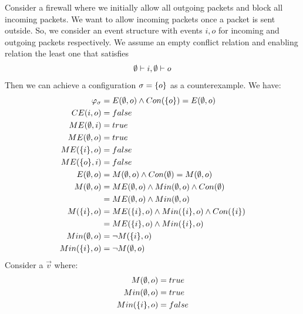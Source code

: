 \documentclass{article}
\begin{document}
\begin{example}
    Consider a firewall where we initially allow all outgoing packets and block all incoming packets.
    We want to allow incoming packets once a packet is sent outside.
    So, we consider an event structure with events $i,o$ for incoming and
    outgoing packets respectively.
    We assume an empty conflict relation and enabling relation
    the least one that satisfies
    \begin{align*}
        \emptyset \vdash i, \emptyset \vdash o
    \end{align*}
    Then we can achieve a configuration $\sigma = \{o\}$ as a
    counterexample.
    We have:
    \begin{align*}
        \varphi_{\sigma} & = E(\emptyset, o) \wedge Con(\{o\})
        = E(\emptyset, o)
        \\
        CE(i,o)          & = false                                             \\
        ME(\emptyset, i)        & = true                                              \\
        ME(\emptyset, o)        & = true                                              \\
        ME(\{i\}, o)     & = false                                             \\
        ME(\{o\}, i)     & = false                                             \\
        E(\emptyset, o)         & = M(\emptyset,o) \wedge Con(\emptyset)
        = M(\emptyset, o)                                                             \\
        M(\emptyset, o)         & = ME(\emptyset,o) \wedge Min(\emptyset, o)\wedge Con(\emptyset)          \\
                         & = ME(\emptyset,o) \wedge Min(\emptyset, o)                        \\
        M(\{i\},o)       & = ME(\{i\},o) \wedge Min(\{i\},o) \wedge Con(\{i\}) \\
                         & = ME(\{i\},o) \wedge Min(\{i\},o)                   \\
        Min(\emptyset, o)       & = \neg M(\{i\},o)                                   \\
        Min(\{i\},o)     & = \neg M(\emptyset,o)
    \end{align*}
    Consider a $\vec v$ where:
    \begin{align*}
        M(\e, o)      & = true  \\
        Min(\e, o)    & = true  \\
        Min(\s{i}, o) & = false \\

\end{align*}
\end{example}
\end{document}
